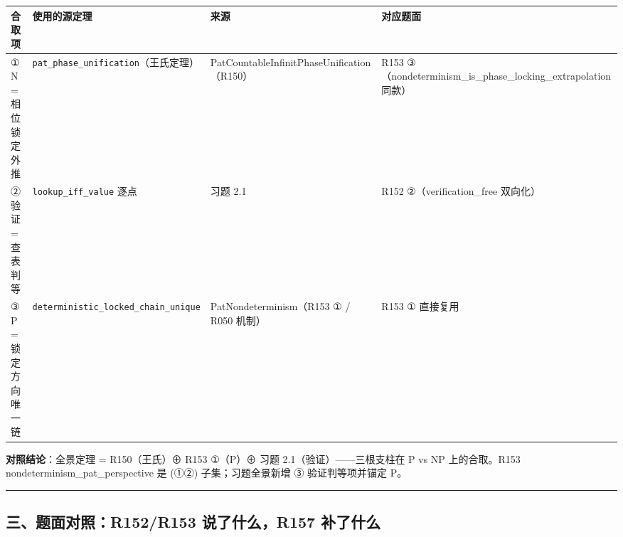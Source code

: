 \documentclass[
]{article}
\newcounter{none} %
\begin{document}
{\def\LTcaptype{none} %
\begin{longtable}[]{@{}
 >{\raggedright\arraybackslash}p{}
 >{\raggedright\arraybackslash}p{}
 >{\raggedright\arraybackslash}p{}
 >{\raggedright\arraybackslash}p{}@{}}
\toprule\noalign{}
\begin{minipage}[b]{\linewidth}\raggedright
合取项
\end{minipage} & \begin{minipage}[b]{\linewidth}\raggedright
使用的源定理
\end{minipage} & \begin{minipage}[b]{\linewidth}\raggedright
来源
\end{minipage} & \begin{minipage}[b]{\linewidth}\raggedright
对应题面
\end{minipage} \\
\midrule\noalign{}
\endhead
\bottomrule\noalign{}
\endlastfoot
① N = 相位锁定外推 & \texttt{pat\_phase\_unification}（王氏定理） &
PatCountableInfinitPhaseUnification（R150） & R153
③（nondeterminism\_is\_phase\_locking\_extrapolation 同款） \\
② 验证 = 查表判等 & \texttt{lookup\_iff\_value} 逐点 & 习题 2.1 & R152
②（verification\_free 双向化） \\
③ P = 锁定方向唯一链 & \texttt{deterministic\_locked\_chain\_unique} &
PatNondeterminism（R153 ① / R050 机制） & R153 ① 直接复用 \\
\end{longtable}
}

\textbf{对照结论}：全景定理 = R150（王氏）⊕ R153 ①（P）⊕ 习题
2.1（验证）------三根支柱在 P vs NP 上的合取。R153
nondeterminism\_pat\_perspective 是 (①②) 子集；习题全景新增 ③
验证判等项并锚定 P。

\begin{center}\rule{0.5\linewidth}{0.5pt}\end{center}

\subsection{三、题面对照：R152/R153 说了什么，R157
补了什么}\label{ux4e09ux9898ux9762ux5bf9ux7167r152r153-ux8bf4ux4e86ux4ec0ux4e48r157-ux8865ux4e86ux4ec0ux4e48}
\end{document}
